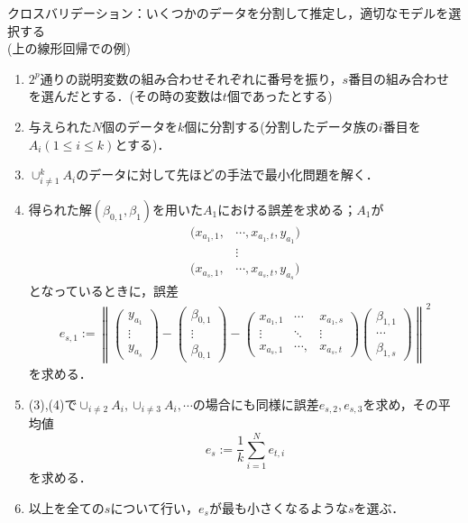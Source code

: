 \documentclass{jsarticle}
\theoremstyle{definition}
\begin{document}
クロスバリデーション：いくつかのデータを分割して推定し，適切なモデルを選択する\\
(上の線形回帰での例)
\begin{enumerate}[(1)]
\item $2^p$通りの説明変数の組み合わせそれぞれに番号を振り，$s$番目の組み合わせを選んだとする．(その時の変数は$t$個であったとする)\\

\item 与えられた$N$個のデータを$k$個に分割する(分割したデータ族の$i$番目を$A_i(1\leq i\leq k)$とする)．\\

\item $\cup_{i\neq1}^kA_i$のデータに対して先ほどの手法で最小化問題を解く．\\

\item 得られた解$(\beta_{0,1},\beta_{1})$を用いた$A_1$における誤差を求める；$A_1$が
\begin{align*}
(x_{a_1,1},&\cdots,x_{a_1,t},y_{a_1})\\
&\vdots\\
(x_{a_s,1},&\cdots, x_{a_s,t},y_{a_s})
\end{align*}
となっているときに，誤差
\begin{align*}
e_{s,1}:=\left\|\begin{pmatrix}
y_{a_1}\\
\vdots\\
y_{a_s}
\end{pmatrix}-\begin{pmatrix}
\beta_{0,1}\\
\vdots\\
\beta_{0,1}
\end{pmatrix}-\begin{pmatrix}
x_{a_1,1}&\cdots&x_{a_1,s}\\
\vdots & \ddots & \vdots\\
x_{a_s,1}&\cdots,&x_{a_s,t}
\end{pmatrix}\begin{pmatrix}
\beta_{1,1}\\
\cdots\\
\beta_{1,s}
\end{pmatrix}\right\|^2
\end{align*}
を求める．\\

\item (3),(4)で$\cup_{i\neq 2}A_i,\cup_{i\neq 3}A_i,\cdots$の場合にも同様に誤差$e_{s,2},e_{s,3}$を求め，その平均値
$$e_{s}:=\frac{1}{k}\sum_{i=1}^Ne_{t,i}$$
を求める．\\

\item 以上を全ての$s$について行い，$e_s$が最も小さくなるような$s$を選ぶ．\\
\end{enumerate}
\end{document}

